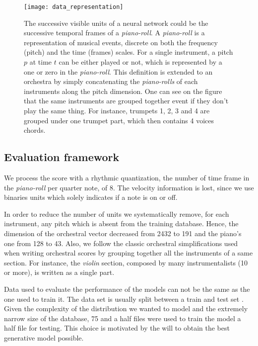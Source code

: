\documentclass[letterpaper]{article}
\begin{document}
\begin{figure}
\centering
\texttt{[image: data\_representation]}
\caption{The successive visible units of a neural network could be the successive temporal frames of a \textit{piano-roll}. A \textit{piano-roll} is a representation of musical events, discrete on both the frequency (pitch) and the time (frames) scales. For a single instrument, a pitch $p$ at time $t$ can be either played or not, which is represented by a one or zero in the \textit{piano-roll}. This definition is extended to an orchestra by simply concatenating the \textit{piano-rolls} of each instruments along the pitch dimension. One can see on the figure that the same instruments are grouped together event if they don't play the same thing. For instance, trumpets 1, 2, 3 and 4 are grouped under one trumpet part, which then contains 4 voices chords.}
\label{fig:piano-roll}
\end{figure}

\subsection{Evaluation framework}
We process the score with a rhythmic quantization, the number of time frame in the \textit{piano-roll} per quarter note, of 8.
The velocity information is lost, since we use binaries units which solely indicates if a note is on or off. 

In order to reduce the number of units we systematically remove, for each instrument, any pitch which is absent from the training database. Hence, the dimension of the orchestral vector decreased from 2432 to 191 and the piano's one from 128 to 43.
Also, we follow the classic orchestral simplifications used when writing orchestral scores by grouping together all the instruments of a same section. For instance, the \textit{violin} section, composed by many instrumentalists (10 or more), is written as a single part.

Data used to evaluate the performance of the models can not be the same as the one used to train it. The data set is usually split between a train and test set \cite{bishop2006pattern}.
Given the complexity of the distribution we wanted to model and the extremely narrow size of the database, 75 and a half files were used to train the model a half file for testing. This choice is motivated by the will to obtain the best generative model possible.
\end{document}
